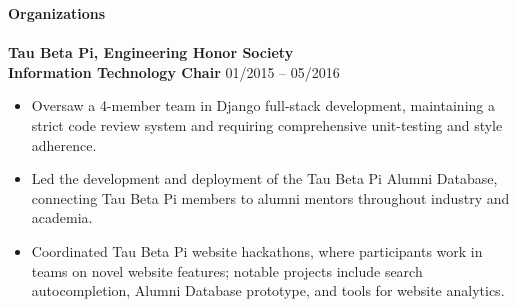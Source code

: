 \documentclass{article}
\begin{document}

\newpage
\noindent
\textbf{{\Large Organizations}}\\[-2mm]
\HRule\\
\textbf{Tau Beta Pi, Engineering Honor Society} \\
\textbf{Information Technology Chair}
\hfill 01/2015 -- 05/2016
\begin{itemize}
\vspace{-2.5mm}
\item Oversaw a 4-member team in Django full-stack development, maintaining a strict code review system and requiring comprehensive unit-testing and style adherence.
\vspace{-2.5mm}
\item Led the development and deployment of the Tau Beta Pi Alumni Database, connecting Tau Beta Pi members to alumni mentors throughout industry and academia.
\vspace{-2.5mm}
\item Coordinated Tau Beta Pi website hackathons, where participants work in teams on novel website features; notable projects include search autocompletion, Alumni Database prototype, and tools for website analytics.
\end{itemize}
\vspace{-3.0mm}
\end{document}
